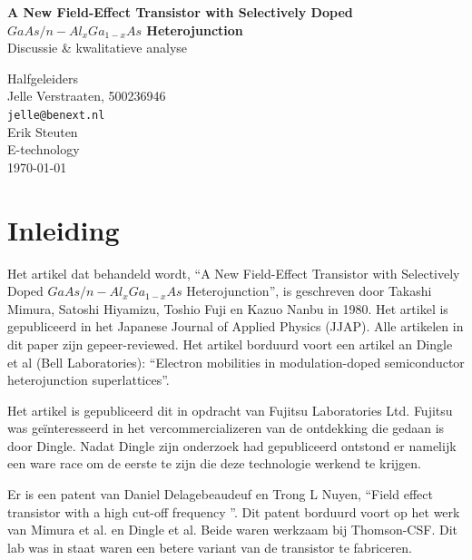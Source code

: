 \documentclass[11pt]{article}
\newlength{\leftbarwidth}
\newlength{\leftbarsep}
\newcommand*{\leftbarcolorcmd}{\color{leftbarcolor}}%
\renewenvironment{leftbar}{%
    \def\FrameCommand{{\leftbarcolorcmd{\vrule width \leftbarwidth\relax\hspace {\leftbarsep}}}}%
    \MakeFramed {\advance \hsize -\width \FrameRestore }}{\endMakeFramed}
\begin{document}
\begin{titlepage}
\begin{center}
{\huge\bfseries A New Field-Effect Transistor with Selectively Doped $GaAs/n-Al_{x}Ga_{1-x}As$ Heterojunction}
\\ \bigskip
{\Large Discussie \& kwalitatieve analyse}
\end{center}
\vfill
\begin{flushleft}
\setlength{\leftbarwidth}{1pt}
\begin{leftbar}
Halfgeleiders \\
Jelle Verstraaten, 500236946 \\
\texttt{jelle@benext.nl} \\
Erik Steuten\\
E-technology \\
{\small \today} \\
\end{leftbar}
\end{flushleft}
\end{titlepage}

\newpage
\tableofcontents
\newpage

\section{Inleiding}

Het artikel dat behandeld wordt, ``A New Field-Effect Transistor with Selectively Doped $GaAs/n-Al_{x}Ga_{1-x}As$ Heterojunction'', is geschreven door Takashi Mimura, Satoshi Hiyamizu, Toshio Fuji en Kazuo Nanbu in 1980. Het artikel is gepubliceerd in het Japanese Journal of Applied Physics (JJAP). Alle artikelen in dit paper zijn gepeer-reviewed. Het artikel borduurd voort een artikel an Dingle et al (Bell Laboratories): ``Electron mobilities in modulation-doped semiconductor heterojunction superlattices''.

Het artikel is gepubliceerd dit in opdracht van Fujitsu Laboratories Ltd. Fujitsu was ge\"interesseerd in het vercommercializeren van de ontdekking die gedaan is door Dingle. Nadat Dingle zijn onderzoek had gepubliceerd ontstond er namelijk een ware race om de eerste te zijn die deze technologie werkend te krijgen.

Er is een patent van Daniel Delagebeaudeuf en Trong L Nuyen, ``Field effect transistor with a high cut-off frequency ''. Dit patent borduurd voort op het werk van Mimura et al. en Dingle et al. Beide waren werkzaam bij Thomson-CSF. Dit lab was in staat waren een betere variant van de transistor te fabriceren. 
\end{document}
